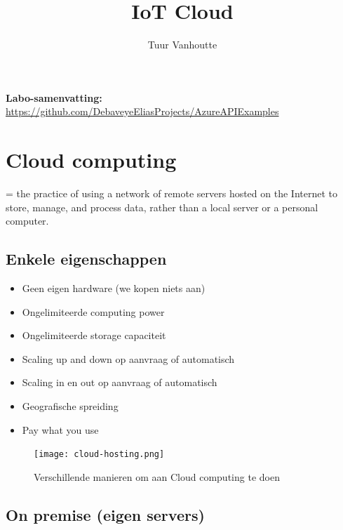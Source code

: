 \documentclass{article}
\newcommand{\bold}[1]{\textbf{#1}}
\begin{document}
\begin{titlepage}
    \author{Tuur Vanhoutte}
    \title{IoT Cloud}
\end{titlepage}

\maketitle
\newpage
\tableofcontents
\newpage


\bold{Labo-samenvatting:} \url{https://github.com/DebaveyeEliasProjects/AzureAPIExamples}

\section{Cloud computing}

= the practice of using a network of remote servers hosted on the Internet to store, manage, and process data, rather than a local server or a personal computer.

\subsection{Enkele eigenschappen}
\begin{itemize}
    \item Geen eigen hardware (we kopen niets aan)
    \item Ongelimiteerde computing power
    \item Ongelimiteerde storage capaciteit
    \item Scaling up and down op aanvraag of automatisch
    \item Scaling in en out op aanvraag of automatisch
    \item Geografische spreiding
    \item Pay what you use
\end{itemize}

\begin{figure}[H]
    \centering
    \texttt{[image: cloud-hosting.png]}
    \caption{Verschillende manieren om aan Cloud computing te doen}
\end{figure}


\subsection{On premise (eigen servers)}
\end{document}
